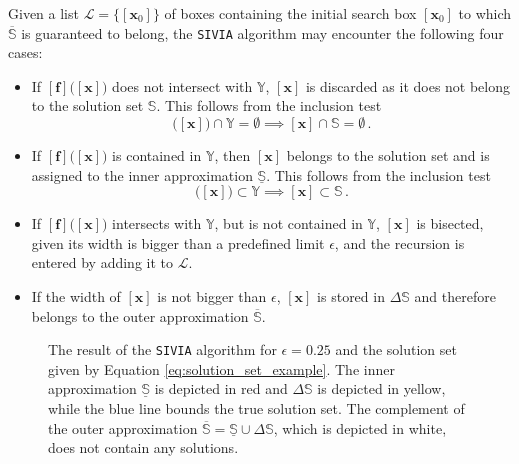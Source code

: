 Given a list $\mathcal{L} = \big\{[\bm{x}_0]\big\}$ of boxes containing the initial search box $[\bm{x}_0]$ to which $\overline{\mathbb{S}}$ is guaranteed to belong, the \texttt{SIVIA} algorithm may encounter the following four cases:

\begin{itemize}
\item  If $[\bm{f}]\big([\bm{x}]\big)$ does not intersect with $\mathbb{Y}$, $[\bm{x}]$ is discarded as it does not belong to the solution set $\mathbb{S}$. This follows from the inclusion test
\begin{equation}
[\bm{f}]\big([\bm{x}]\big) \cap \mathbb{Y} = \emptyset \implies [\bm{x}] \cap \mathbb{S} = \emptyset \,.
\end{equation}

\item  If $[\bm{f}]\big([\bm{x}]\big)$ is contained in $\mathbb{Y}$, then $[\bm{x}]$ belongs to the solution set and is assigned to the inner approximation $\underline{\mathbb{S}}$. This follows from the inclusion test 
\begin{equation}
[\bm{f}]\big([\bm{x}]\big) \subset \mathbb{Y} \implies [\bm{x}] \subset \mathbb{S} \,.
\end{equation}

\item If $[\bm{f}]\big([\bm{x}]\big)$ intersects with $\mathbb{Y}$, but is not contained in $\mathbb{Y}$, $[\bm{x}]$ is bisected, given its width is bigger than a predefined limit $\epsilon$, and the recursion is entered by adding it to $\mathcal{L}$.

\item If the width of $[\bm{x}]$ is not bigger than $\epsilon$, $[\bm{x}]$ is stored in $\Delta\mathbb{S}$ and therefore belongs to the outer approximation $\overline{\mathbb{S}}$.
\end{itemize}



\begin{figure}
	\centering
	\setlength{} 	
	\setlength{}		
				
	\caption[A result of the \texttt{SIVIA} algorithm.]{The result of the \texttt{SIVIA} algorithm for $\epsilon = 0.25$ and the solution set given by Equation \ref{eq:solution_set_example}. The inner approximation $\underline{\mathbb{S}}$ is depicted in red and $\Delta\mathbb{S}$ is depicted in yellow, while the blue line bounds the true solution set. The complement of the outer approximation $\overline{\mathbb{S}} = \underline{\mathbb{S}} \cup \Delta\mathbb{S}$, which is depicted in white, does not contain any solutions.}		
	\label{fig:sivia}			
\end{figure}


